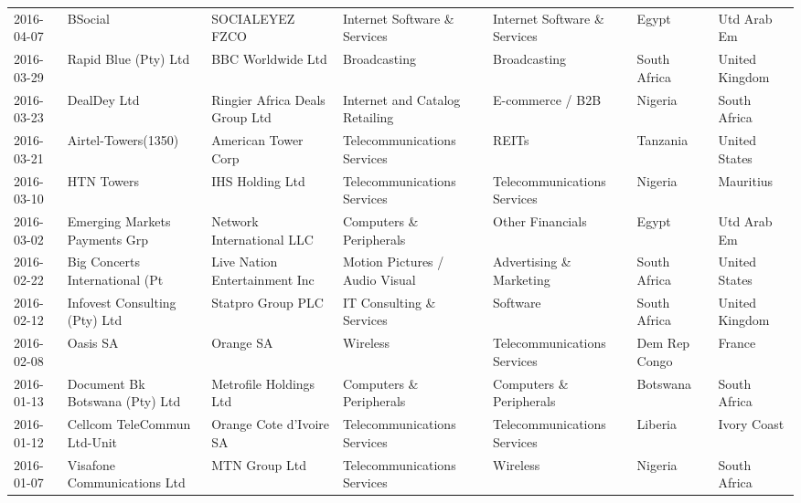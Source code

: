 \documentclass[11pt]{article}
\begin{document}
\begin{tabular}{lllllll}
	 2016-04-07 & BSocial                        & SOCIALEYEZ FZCO                & Internet Software \& Services   & Internet Software \& Services      & Egypt         & Utd Arab Em   \\
	 2016-03-29 & Rapid Blue (Pty) Ltd           & BBC Worldwide Ltd              & Broadcasting                   & Broadcasting                      & South Africa  & United Kingdom\\
	 2016-03-23 & DealDey Ltd                    & Ringier Africa Deals Group Ltd & Internet and Catalog Retailing & E-commerce / B2B                  & Nigeria       & South Africa  \\
	 2016-03-21 & Airtel-Towers(1350)            & American Tower Corp            & Telecommunications Services    & REITs                             & Tanzania      & United States \\
	 2016-03-10 & HTN Towers                     & IHS Holding Ltd                & Telecommunications Services    & Telecommunications Services       & Nigeria       & Mauritius     \\
	 2016-03-02 & Emerging Markets Payments Grp  & Network International LLC      & Computers \& Peripherals        & Other Financials                  & Egypt         & Utd Arab Em   \\
	 2016-02-22 & Big Concerts International (Pt & Live Nation Entertainment Inc  & Motion Pictures / Audio Visual & Advertising \& Marketing           & South Africa  & United States \\
	 2016-02-12 & Infovest Consulting (Pty) Ltd  & Statpro Group PLC              & IT Consulting \& Services       & Software                          & South Africa  & United Kingdom\\
	 2016-02-08 & Oasis SA                       & Orange SA                      & Wireless                       & Telecommunications Services       & Dem Rep Congo & France        \\
	 2016-01-13 & Document Bk Botswana (Pty) Ltd & Metrofile Holdings Ltd         & Computers \& Peripherals        & Computers \& Peripherals           & Botswana      & South Africa  \\
	 2016-01-12 & Cellcom TeleCommun Ltd-Unit    & Orange Cote d'Ivoire SA        & Telecommunications Services    & Telecommunications Services       & Liberia       & Ivory Coast   \\
	 2016-01-07 & Visafone Communications Ltd    & MTN Group Ltd                  & Telecommunications Services    & Wireless                          & Nigeria       & South Africa  \\
\end{tabular}
\end{document}
